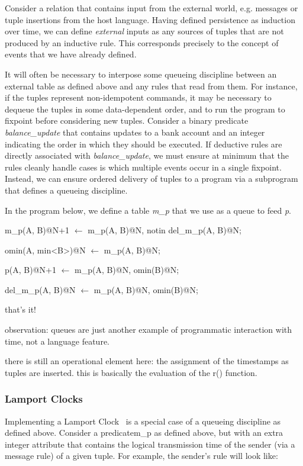 Consider a relation that contains input from the external world, e.g. messages or tuple insertions from the host language.  
Having defined persistence as induction over time, we can define \emph{external} inputs as any sources of tuples 
that are not produced by an inductive rule.  This corresponds precisely to the concept of events that we have already
defined.

It will often be necessary to interpose some queueing discipline between an external table as defined above and any
rules that read from them.  For instance, if the tuples represent non-idempotent commands, it may be necessary to dequeue
the tuples in some data-dependent order, and to run the program to fixpoint before considering new tuples.  Consider a binary
predicate \emph{balance\_update} that contains updates to a bank account and an integer indicating the order in which they
should be executed.  If deductive rules are directly associated with \emph{balance\_update}, we must ensure at minimum that
the rules cleanly handle cases is which multiple events occur in a single fixpoint.  Instead, we can ensure ordered delivery 
of tuples to a program via a subprogram that defines a queueing discipline.

In the program below, we define a table \emph{m\_p} that we use as a queue to feed \emph{p}.  


\begin{Dedalus}
m\_p(A, B)@N+1 \(\leftarrow\)
  m\_p(A, B)@N,
  notin del\_m\_p(A, B)@N;

omin(A, min<B>)@N \(\leftarrow\)
  m\_p(A, B)@N;

p(A, B)@N+1 \(\leftarrow\)
  m\_p(A, B)@N,
  omin(B)@N;

del\_m\_p(A, B)@N \(\leftarrow\)
  m\_p(A, B)@N,
  omin(B)@N;
\end{Dedalus}

that's it!

observation: queues are just another example of programmatic interaction with time, not a language feature.

there is still an operational element here: the assignment of the timestamps as tuples are inserted.  this is basically the 
evaluation of the r() function.

\subsubsection{Lamport Clocks}

Implementing a Lamport Clock~\cite{timeclocks} is a special case of a queueing discipline as defined above.
Consider a predicate{m\_p} as defined above, but with an extra integer attribute that contains the logical transmission
time of the sender (via a message rule) of a given tuple.  For example, the sender's rule will look like: 

